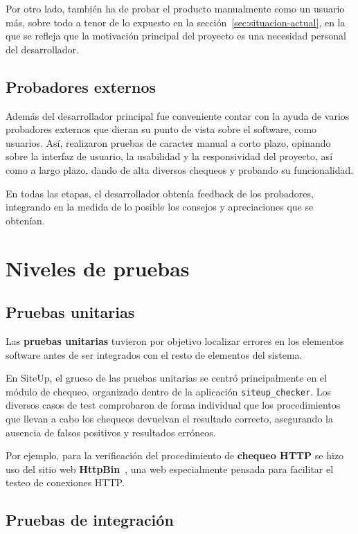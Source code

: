 Por otro lado, también ha de probar el producto manualmente como un usuario más,
sobre todo a tenor de lo expuesto en la sección~\ref{sec:situacion-actual}, en
la que se refleja que la motivación principal del proyecto es una necesidad
personal del desarrollador.

\subsection{Probadores externos}

Además del desarrollador principal fue conveniente contar con la ayuda de varios
probadores externos que dieran su punto de vista sobre el software, como
usuarios. Así, realizaron pruebas de caracter manual a corto plazo, opinando
sobre la interfaz de usuario, la usabilidad y la responsividad del proyecto, así
como a largo plazo, dando de alta diversos chequeos y probando su funcionalidad.

En todas las etapas, el desarrollador obtenía feedback de los probadores,
integrando en la medida de lo posible los consejos y apreciaciones que se obtenían.


\section{Niveles de pruebas}

\subsection{Pruebas unitarias}
Las \textbf{pruebas unitarias} tuvieron por objetivo localizar errores en los
elementos software antes de ser integrados con el resto de elementos del sistema.

En SiteUp, el grueso de las pruebas unitarias se centró principalmente en el
módulo de chequeo, organizado dentro de la aplicación
\texttt{siteup\_checker}. Los diversos casos de test comprobaron de forma
individual que los procedimientos que llevan a cabo los chequeos devuelvan el
resultado correcto, asegurando la ausencia de falsos positivos y resultados
erróneos.

Por ejemplo, para la verificación del procedimiento de \textbf{chequeo HTTP} se
hizo uso del sitio web \textbf{HttpBin}~\cite{httpbin}, una web especialmente
pensada para facilitar el testeo de conexiones HTTP.

\subsection{Pruebas de integración}

